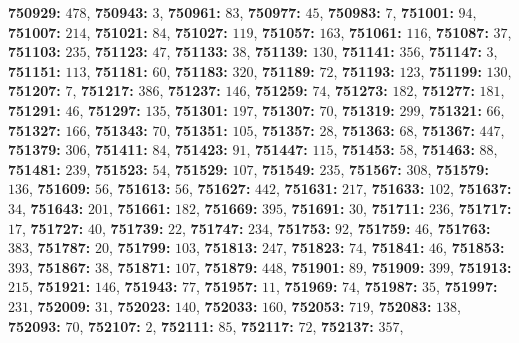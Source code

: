 \textsf{\bfseries 750929:} $478$, \textsf{\bfseries 750943:} $3$, \textsf{\bfseries 750961:} $83$, \textsf{\bfseries 750977:} $45$, \textsf{\bfseries 750983:} $7$, \textsf{\bfseries 751001:} $94$, \textsf{\bfseries 751007:} $214$, \textsf{\bfseries 751021:} $84$, \textsf{\bfseries 751027:} $119$, \textsf{\bfseries 751057:} $163$, \textsf{\bfseries 751061:} $116$, \textsf{\bfseries 751087:} $37$, \textsf{\bfseries 751103:} $235$, \textsf{\bfseries 751123:} $47$, \textsf{\bfseries 751133:} $38$, \textsf{\bfseries 751139:} $130$, \textsf{\bfseries 751141:} $356$, \textsf{\bfseries 751147:} $3$, \textsf{\bfseries 751151:} $113$, \textsf{\bfseries 751181:} $60$, \textsf{\bfseries 751183:} $320$, \textsf{\bfseries 751189:} $72$, \textsf{\bfseries 751193:} $123$, \textsf{\bfseries 751199:} $130$, \textsf{\bfseries 751207:} $7$, \textsf{\bfseries 751217:} $386$, \textsf{\bfseries 751237:} $146$, \textsf{\bfseries 751259:} $74$, \textsf{\bfseries 751273:} $182$, \textsf{\bfseries 751277:} $181$, \textsf{\bfseries 751291:} $46$, \textsf{\bfseries 751297:} $135$, \textsf{\bfseries 751301:} $197$, \textsf{\bfseries 751307:} $70$, \textsf{\bfseries 751319:} $299$, \textsf{\bfseries 751321:} $66$, \textsf{\bfseries 751327:} $166$, \textsf{\bfseries 751343:} $70$, \textsf{\bfseries 751351:} $105$, \textsf{\bfseries 751357:} $28$, \textsf{\bfseries 751363:} $68$, \textsf{\bfseries 751367:} $447$, \textsf{\bfseries 751379:} $306$, \textsf{\bfseries 751411:} $84$, \textsf{\bfseries 751423:} $91$, \textsf{\bfseries 751447:} $115$, \textsf{\bfseries 751453:} $58$, \textsf{\bfseries 751463:} $88$, \textsf{\bfseries 751481:} $239$, \textsf{\bfseries 751523:} $54$, \textsf{\bfseries 751529:} $107$, \textsf{\bfseries 751549:} $235$, \textsf{\bfseries 751567:} $308$, \textsf{\bfseries 751579:} $136$, \textsf{\bfseries 751609:} $56$, \textsf{\bfseries 751613:} $56$, \textsf{\bfseries 751627:} $442$, \textsf{\bfseries 751631:} $217$, \textsf{\bfseries 751633:} $102$, \textsf{\bfseries 751637:} $34$, \textsf{\bfseries 751643:} $201$, \textsf{\bfseries 751661:} $182$, \textsf{\bfseries 751669:} $395$, \textsf{\bfseries 751691:} $30$, \textsf{\bfseries 751711:} $236$, \textsf{\bfseries 751717:} $17$, \textsf{\bfseries 751727:} $40$, \textsf{\bfseries 751739:} $22$, \textsf{\bfseries 751747:} $234$, \textsf{\bfseries 751753:} $92$, \textsf{\bfseries 751759:} $46$, \textsf{\bfseries 751763:} $383$, \textsf{\bfseries 751787:} $20$, \textsf{\bfseries 751799:} $103$, \textsf{\bfseries 751813:} $247$, \textsf{\bfseries 751823:} $74$, \textsf{\bfseries 751841:} $46$, \textsf{\bfseries 751853:} $393$, \textsf{\bfseries 751867:} $38$, \textsf{\bfseries 751871:} $107$, \textsf{\bfseries 751879:} $448$, \textsf{\bfseries 751901:} $89$, \textsf{\bfseries 751909:} $399$, \textsf{\bfseries 751913:} $215$, \textsf{\bfseries 751921:} $146$, \textsf{\bfseries 751943:} $77$, \textsf{\bfseries 751957:} $11$, \textsf{\bfseries 751969:} $74$, \textsf{\bfseries 751987:} $35$, \textsf{\bfseries 751997:} $231$, \textsf{\bfseries 752009:} $31$, \textsf{\bfseries 752023:} $140$, \textsf{\bfseries 752033:} $160$, \textsf{\bfseries 752053:} $719$, \textsf{\bfseries 752083:} $138$, \textsf{\bfseries 752093:} $70$, \textsf{\bfseries 752107:} $2$, \textsf{\bfseries 752111:} $85$, \textsf{\bfseries 752117:} $72$, \textsf{\bfseries 752137:} $357$, 
